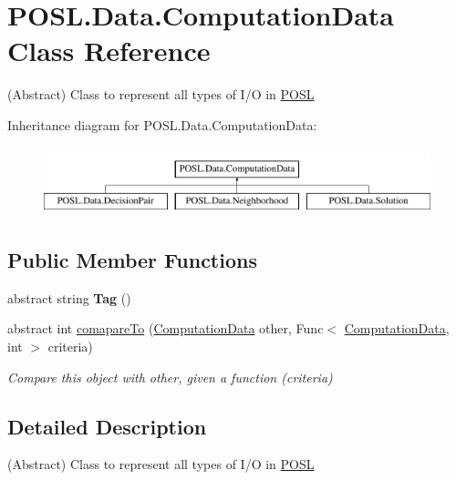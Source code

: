 \hypertarget{classPOSL_1_1Data_1_1ComputationData}{}\section{P\+O\+S\+L.\+Data.\+Computation\+Data Class Reference}
\label{classPOSL_1_1Data_1_1ComputationData}


(Abstract) Class to represent all types of I/O in \hyperlink{namespacePOSL}{P\+O\+SL}  


Inheritance diagram for P\+O\+S\+L.\+Data.\+Computation\+Data\+:\begin{figure}[H]
\begin{center}
\leavevmode
\includegraphics[height=2.000000cm]{classPOSL_1_1Data_1_1ComputationData}
\end{center}
\end{figure}
\subsection*{Public Member Functions}
\begin{DoxyCompactItemize}
\item 
\mbox{\label{classPOSL_1_1Data_1_1ComputationData_ae347eba974b43e63f1aa984ef7475f9d}} 
abstract string {\bfseries Tag} ()
\item 
abstract int \hyperlink{classPOSL_1_1Data_1_1ComputationData_a6cca889bb4ce32104d91dba413ef8c56}{comapare\+To} (\hyperlink{classPOSL_1_1Data_1_1ComputationData}{Computation\+Data} other, Func$<$ \hyperlink{classPOSL_1_1Data_1_1ComputationData}{Computation\+Data}, int $>$ criteria)
\begin{DoxyCompactList}\small\item\em Compare this object with other, given a function (criteria) \end{DoxyCompactList}\end{DoxyCompactItemize}


\subsection{Detailed Description}
(Abstract) Class to represent all types of I/O in \hyperlink{namespacePOSL}{P\+O\+SL} 

